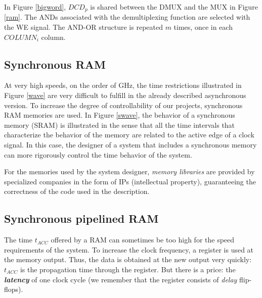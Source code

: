 In Figure \ref{bigword}, $DCD_p$ is shared between the DMUX and the MUX in Figure \ref{ram}. The ANDs associated with the demultiplexing function are selected with the WE signal. The AND-OR structure is repeated $m$ times, once in each $COLUMN_i$ column.

\subsection{Synchronous RAM}\label{syncMem}

At very high speeds, on the order of GHz, the time restrictions illustrated in Figure \ref{wave} are very difficult to fulfill in the already described asynchronous version. To increase the degree of controllability of our projects, synchronous RAM memories are used. In Figure \ref{swave}, the behavior of a synchronous memory (SRAM) is illustrated in the sense that all the time intervals that characterize the behavior of the memory are related to the active edge of a clock signal. In this case, the designer of a system that includes a synchronous memory can more rigorously control the time behavior of the system.

For the memories used by the system designer, {\em memory libraries} are provided by specialized companies in the form of IPs (intellectual property), guaranteeing the correctness of the code used in the description.



\subsection{Synchronous pipelined RAM}\label{sybcPipeMem}

The time $t_{ACC}$ offered by a RAM can sometimes be too high for the speed requirements of the system. To increase the clock frequency, a register is used at the memory output. Thus, the data is obtained at the new output very quickly: $t_{ACC}$ is the propagation time through the register. But there is a price: the {\bf {\em latency}} of one clock cycle (we remember that the register consists of {\em delay} flip-flops).

